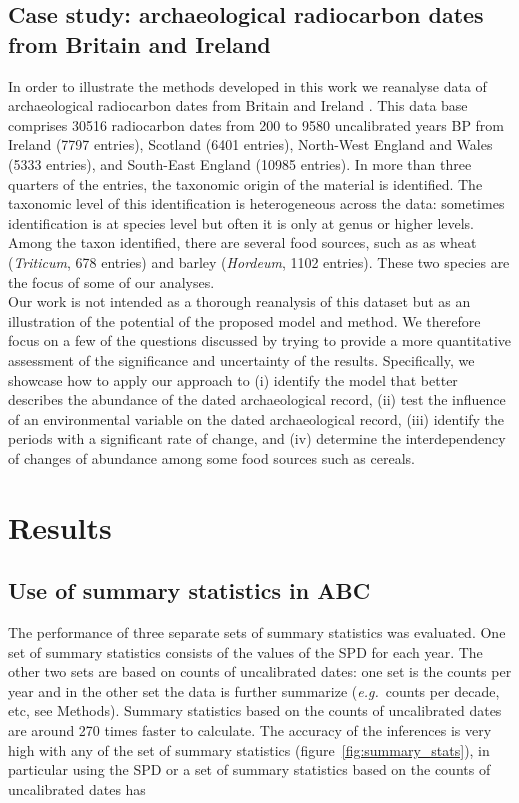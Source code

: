 \documentclass[a4paper]{article}
\begin{document}
\subsection*{Case study: archaeological radiocarbon dates from Britain and Ireland}

In order to illustrate the methods developed in this work we reanalyse data of archaeological radiocarbon dates from Britain and Ireland \parencite{Bevan2017b}. This data base comprises 30516 radiocarbon dates from 200 to 9580 uncalibrated years BP from Ireland (7797 entries), Scotland (6401 entries), North-West England and Wales (5333 entries), and South-East England (10985 entries). In more than three quarters of the entries, the taxonomic origin of the material is identified. The taxonomic level of this identification is heterogeneous across the data: sometimes identification is at species level but often it is only at genus or higher levels. Among the taxon identified, there are several food sources, such as as wheat (\emph{Triticum}, 678 entries) and barley (\emph{Hordeum}, 1102 entries). These two species are the focus of some of our analyses.
\\

Our work is not intended as a thorough reanalysis of this dataset but as an illustration of the potential of the proposed model and method. We therefore focus on a few of the questions discussed by \textcite{Bevan2017a} trying to provide a more quantitative assessment of the significance and uncertainty of the results. Specifically, we showcase how to apply our approach to (i) identify the model that better describes the abundance of the dated archaeological record, (ii) test the influence of an environmental variable on the dated archaeological record, (iii) identify the periods with a significant rate of change, and (iv) determine the interdependency of changes of abundance among some food sources such as cereals.
\\


\section*{\centering Results}

\subsection*{Use of summary statistics in ABC}

The performance of three separate sets of summary statistics was evaluated. One set of summary statistics consists of the values of the SPD for each year. The other two sets are based on counts of uncalibrated dates: one set is the counts per year and in the other set the data is further summarize (\emph{e.g.}\ counts per decade, etc, see Methods). Summary statistics based on the counts of uncalibrated dates are around 270 times faster to calculate. The accuracy of the inferences is very high with any of the set of summary statistics (figure~\ref{fig:summary_stats}), in particular using the SPD or a set of summary statistics based on the counts of uncalibrated dates has
\end{document}
